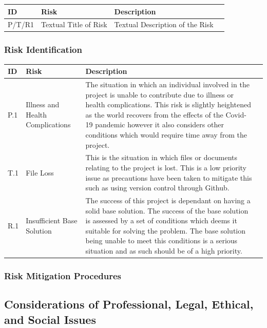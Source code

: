 \documentclass[12pt]{article}  %
\theoremstyle{definition}
\theoremstyle{remark}
\begin{document}
\begin{tabularx}{1.1\textwidth} {
	|  >{\center\arraybackslash}X
	| >{\center\arraybackslash}X
	| >{\center\arraybackslash}X
	| >{\center\arraybackslash} X | }
	\hline
	ID & Risk & Description \\
	\hline
	P/T/R1 & Textual Title of Risk & Textual Description of the Risk \\
	\hline
\end{tabularx}

\subsubsection {Risk Identification}

\begin{tabularx}{1.1\textwidth} {
	|  >{\center\arraybackslash}X
	| >{\center\arraybackslash}X
	| >{\center\arraybackslash}X
	| >{\center\arraybackslash} X | }
	\hline
	ID & Risk & Description \\
	\hline
	P.1 & Illness and Health Complications & The situation in which an individual involved in the project is unable to contribute due to illness or health complications. This risk is slightly heightened as the world recovers from the effects of the Covid-19 pandemic however it also considers other conditions which would require time away from the project. \\
	\hline
	T.1 & File Loss & This is the situation in which files or documents relating to the project is lost. This is a low priority issue as precautions have been taken to mitigate this such as using version control through Github. \\
	\hline
	R.1 & Insufficient Base Solution & The success of this project is dependant on having a solid base solution. The success of the base solution is assessed by a set of conditions which deems it suitable for solving the problem. The base solution being unable to meet this conditions is a serious situation and as such should be of a high priority. \\
	\hline
\end{tabularx}

\subsubsection {Risk Mitigation Procedures}

\subsection {Considerations of Professional, Legal, Ethical, and Social Issues}
\end{document}
